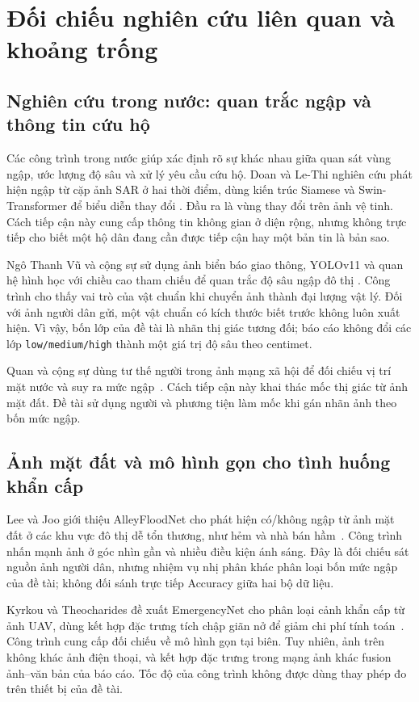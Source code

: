 \section{Đối chiếu nghiên cứu liên quan và khoảng trống}\label{sec:related-work}
\subsection{Nghiên cứu trong nước: quan trắc ngập và thông tin cứu hộ}
Các công trình trong nước giúp xác định rõ sự khác nhau giữa quan sát vùng ngập, ước lượng độ sâu và xử lý yêu cầu cứu hộ. Doan và Le-Thi nghiên cứu phát hiện ngập từ cặp ảnh SAR ở hai thời điểm, dùng kiến trúc Siamese và Swin-Transformer để biểu diễn thay đổi \citep{doan2025sar}. Đầu ra là vùng thay đổi trên ảnh vệ tinh. Cách tiếp cận này cung cấp thông tin không gian ở diện rộng, nhưng không trực tiếp cho biết một hộ dân đang cần được tiếp cận hay một bản tin là bản sao.

Ngô Thanh Vũ và cộng sự sử dụng ảnh biển báo giao thông, YOLOv11 và quan hệ hình học với chiều cao tham chiếu để quan trắc độ sâu ngập đô thị \citep{ngo2025urban}. Công trình cho thấy vai trò của vật chuẩn khi chuyển ảnh thành đại lượng vật lý. Đối với ảnh người dân gửi, một vật chuẩn có kích thước biết trước không luôn xuất hiện. Vì vậy, bốn lớp của đề tài là nhãn thị giác tương đối; báo cáo không đổi các lớp \texttt{low/medium/high} thành một giá trị độ sâu theo centimet.

Quan và cộng sự dùng tư thế người trong ảnh mạng xã hội để đối chiếu vị trí mặt nước và suy ra mức ngập~\citep{quan2020floodlevel}. Cách tiếp cận này khai thác mốc thị giác từ ảnh mặt đất. Đề tài sử dụng người và phương tiện làm mốc khi gán nhãn ảnh theo bốn mức ngập.

\subsection{Ảnh mặt đất và mô hình gọn cho tình huống khẩn cấp}
Lee và Joo giới thiệu AlleyFloodNet cho phát hiện có/không ngập từ ảnh mặt đất ở các khu vực đô thị dễ tổn thương, như hẻm và nhà bán hầm~\citep{lee2025alleyfloodnet}. Công trình nhấn mạnh ảnh ở góc nhìn gần và nhiều điều kiện ánh sáng. Đây là đối chiếu sát nguồn ảnh người dân, nhưng nhiệm vụ nhị phân khác phân loại bốn mức ngập của đề tài; không đối sánh trực tiếp Accuracy giữa hai bộ dữ liệu.

Kyrkou và Theocharides đề xuất EmergencyNet cho phân loại cảnh khẩn cấp từ ảnh UAV, dùng kết hợp đặc trưng tích chập giãn nở để giảm chi phí tính toán~\citep{kyrkou2020emergencynet}. Công trình cung cấp đối chiếu về mô hình gọn tại biên. Tuy nhiên, ảnh trên không khác ảnh điện thoại, và kết hợp đặc trưng trong mạng ảnh khác fusion ảnh--văn bản của báo cáo. Tốc độ của công trình không được dùng thay phép đo trên thiết bị của đề tài.

